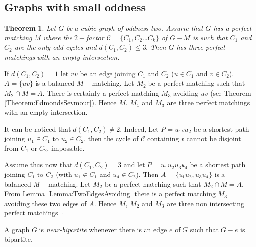 \documentclass{elsart}
\theoremstyle{plain} \theoremheaderfont{\scshape}
\newtheorem{Thm}{\bf Theorem}
\newenvironment{Prf}{{\bf \noindent Proof } }{\hfill$\square$\\}
\begin{document}
\subsection{Graphs with small oddness}
\begin{Thm} \label{Theorem:Distance3Oddness2}Let $G$ be a cubic graph of oddness two. Assume that $G$
has a perfect matching $M$ where the $2-$factor $\mathcal
C=\{C_1,C_2 \ldots C_k\}$ of $G-M$ is such that $C_1$ and $C_2$ are
the only odd cycles and $d(C_1,C_2) \leq 3$. Then $G$ has three
perfect matchings with an empty intersection.
\end{Thm}
\begin{Prf}

If $d(C_1,C_2)=1$ let $uv$ be an edge joining $C_1$ and $C_2$ ($u
\in C_1$ and $v \in C_2$). $A=\{uv\}$ is a balanced $M-$matching.
Let $M_2$ be a perfect matching such that $M_2 \cap M= A$. There is
certainly a perfect matching $M_3$ avoiding $uv$ (see Theorem
\ref{Theorem:EdmondsSeymour}). Hence $M$, $M_1$ and $M_3$ are three
perfect matchings with an empty intersection.

It can be noticed that $d(C_1,C_2) \not = 2$. Indeed, Let
$P=u_1vu_2$ be a shortest path joining $u_1 \in C_1$ to $u_2 \in
C_2$, then the cycle of $\mathcal C$ containing $v$ cannot be
disjoint from $C_1$ or $C_2$, impossible.

Assume thus now that $d(C_1,C_2)  = 3$ and let $P=u_1u_2u_3u_4$ be a
shortest path joining $C_1$ to $C_2$ (with $u_1 \in C_1$ and $u_4
\in C_2$). Then $A=\{u_1u_2,u_3u_4\}$ is a balanced $M-$matching.
Let $M_2$ be a perfect matching such that $M_2 \cap M= A$. From
Lemma \ref{Lemma:TwoEdgesAvoiding} there is a perfect matching $M_3$
avoiding these two edges of $A$. Hence $M$, $M_2$ and $M_3$ are
three non intersecting perfect matchings
\end{Prf}

A graph $G$ is {\em near-bipartite} whenever there is an edge $e$ of
$G$ such that $G-e$ is bipartite.
\end{document}
